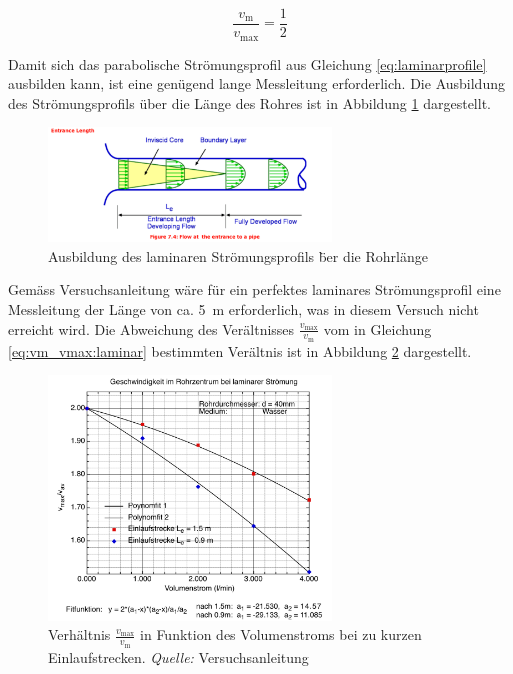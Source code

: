 \begin{equation}
    \label{eq:vm_vmax:laminar}
    \frac{v_{\mathrm{m}}}{v_{\mathrm{max}}} = \frac{1}{2}
\end{equation}


Damit    sich    das     parabolische    Str\"omungsprofil    aus    Gleichung
\ref{eq:laminarprofile} ausbilden kann, ist  eine gen\"ugend lange Messleitung
erforderlich. Die  Ausbildung des  Str\"omungsprofils \"uber  die L\"ange  des
Rohres ist in Abbildung \ref{fig:ausbildungLaminareStromung} dargestellt.

\begin{figure}[h!t]
    \centering
    \includegraphics[width=0.67\textwidth]{images/ausbildung-laminares-stroemungsprofil.png}
    \caption{Ausbildung des laminaren Str\"omungsprofils \"ber die Rohrl\"ange}
    \label{fig:ausbildungLaminareStromung}
\end{figure}

Gem\"ass    Versuchsanleitung   w\"are    f\"ur   ein    perfektes   laminares
Str\"omungsprofil   eine  Messleitung   der  L\"ange   von  ca. \SI{5}{\meter}
erforderlich,  was  in  diesem  Versuch nicht  erreicht  wird. Die  Abweichung
des    Ver\"altnisses    $\frac{v_{\mathrm{max}}}{v_{\mathrm{m}}}$   vom    in
Gleichung  \ref{eq:vm_vmax:laminar} bestimmten  Ver\"altnis  ist in  Abbildung
\ref{fig:einlauf} dargestellt.

\begin{figure}[h!t]
    \centering
    \includegraphics[width=0.67\textwidth]{images/einlauf.png}
    \caption{%
        Verh\"altnis  $\frac{v_{\mathrm{max}}}{v_{\mathrm{m}}}$   in  Funktion
        des     Volumenstroms      bei     zu      kurzen     Einlaufstrecken.
        \emph{Quelle:} Versuchsanleitung
    }
    \label{fig:einlauf}
\end{figure}


